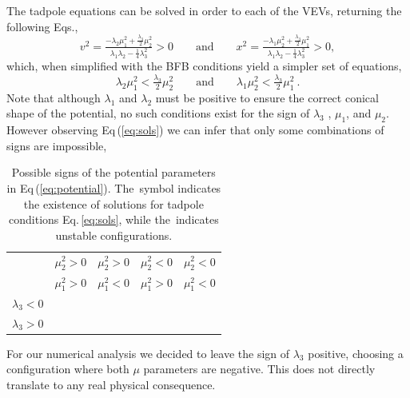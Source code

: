 \documentclass[10pt]{book}
\renewcommand{\(}{\left(}
\renewcommand{\)}{\right)}
\renewcommand{\[}{\left[}
\renewcommand{\]}{\right]}
\newcommand{\xmark}{{\color{red}\ding{55}}}%
\begin{document}
% 
The tadpole equations can be solved in order to each of the VEVs, returning the following Eqs.,
%
\begin{equation}
	v^2 = \tfrac{-\lambda_2 \mu_1^2 + \tfrac{\lambda_3}{2}\mu_2^2}{\lambda_1 \lambda_2 - \tfrac{1}{4}\lambda_3^2} > 0
	\qquad
	\text{and}
	\qquad
	x^2 = \tfrac{-\lambda_1 \mu_2^2 + \tfrac{\lambda_3}{2}\mu_1^2}{\lambda_1 \lambda_2 - \tfrac{1}{4}\lambda_3^2} > 0 , 
	\label{eq:extremum}
\end{equation}
%
which, when simplified with the BFB conditions yield a simpler set of equations,
%
\begin{equation}
\lambda_2 \mu_1^2 < \tfrac{\lambda_3}{2} \mu_2^2 
\qquad
\text{and}
\qquad
\lambda_1 \mu_2^2 < \tfrac{\lambda_3}{2} \mu_1^2 \ . 
\label{eq:sols}
\end{equation}
%
Note that although $\lambda_1$ and $\lambda_2$ must be positive to ensure the correct conical shape of the potential, no such conditions exist for the sign of $\lambda_3$ , $\mu_1$, and $\mu_2$. However observing Eq\,(\ref{eq:sols}) we can infer that only some combinations of signs are impossible, 
%
\begin{table}[H]
	\begin{center}
		\begin{tabular}{ccccc}
			& $\mu_2^2 > 0$ & $\mu_2^2 > 0$ & $\mu_2^2 < 0$ & $\mu_2^2 < 0$  	\\
			& $\mu_1^2 > 0$ & $\mu_1^2 < 0$ & $\mu_1^2 > 0$ & $\mu_1^2 < 0$  	\\        
			\hline  
			$\lambda_3 < 0 $     			    							& 	\xmark		& \checkmark	&	\checkmark & \checkmark	\\
			$\lambda_3 > 0$     			    							& \xmark		& \xmark	&	\xmark &  \checkmark \\
			\hline
		\end{tabular} 
		\caption{Possible signs of the potential parameters in Eq\,(\ref{eq:potential}). 
The \checkmark\,symbol indicates the existence of solutions for tadpole conditions Eq.\,\eqref{eq:sols}, while the \xmark\,indicates unstable configurations.}
		\label{tab:signs}  
	\end{center}
\end{table} 
%
For our numerical analysis we decided to leave the sign of $\lambda_3$ positive, choosing a configuration where both $\mu$ parameters are negative. 
%
This does not directly translate to any real physical consequence.  
\end{document}

